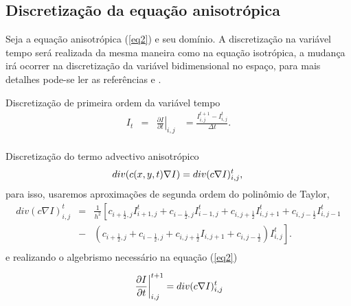 \documentclass[a4paper]{article} %
\begin{document}
\subsection{Discretização da equação anisotrópica}

Seja a equação anisotrópica (\ref{eq2}) e seu domínio. A discretização na variável tempo será realizada da mesma maneira como na equação isotrópica, a mudança irá ocorrer na discretização da variável bidimensional no espaço, para mais detalhes pode-se ler as referências \cite{perona1990scale} e \cite{chen2011iterative}.

Discretização de primeira ordem da variável tempo
\begin{equation}\label{eq6}
\begin{array}{llll}
	I_t&=&\left.\frac{\partial I}{\partial t}\right|_{i,j}&=\frac{I_{i,j}^{t+1}-I_{i,j}^{t}}{\Delta t}.\\
\end{array}
\end{equation}

Discretização do termo advectivo anisotrópico
\begin{equation}\label{eq7}
	div(c(x,y,t)\nabla I)=div(c\nabla I)_{i,j}^{t},\\
\end{equation}
para isso, usaremos aproximações de segunda ordem do polinômio de Taylor,
\begin{equation}\label{eq8}
\begin{array}{lrl}
	div(c\nabla I)_{i,j}^{t}&=&\frac{1}{h^2}\left[c_{i+\frac{1}{2},j}I_{i+1,j}^{t}+c_{i-\frac{1}{2},j}I_{i-1,j}^{t}+c_{i,j+\frac{1}{2}}I_{i,j+1}^{t}+c_{i,j-\frac{1}{2}}I_{i,j-1}^{t}\right.\\
	&-&\left.(c_{i+\frac{1}{2},j}+c_{i-\frac{1}{2},j}+c_{i,j+\frac{1}{2}}I_{i,j+1}+c_{i,j-\frac{1}{2}})I_{i,j}^{t}\right].\\
\end{array}
\end{equation}
e realizando o algebrismo necessário na equação (\ref{eq2})

\begin{equation}\label{eq9}
	\left.\frac{\partial I}{\partial t}\right|_{i,j}^{t+1}=div(c\nabla I)_{i,j}^{t}\\
\end{equation}
\end{document}
